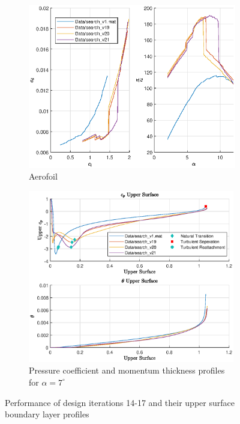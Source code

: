 \documentclass{article}
\begin{document}
\begin{figure}[H]
    \centering
    \begin{subfigure}{0.45\textwidth}
        \centering
        \includegraphics[width=1.2\textwidth, center]{figures/hiRe_lod_21.eps}
        \caption{Aerofoil}
        \label{fig:v21_lod}
    \end{subfigure}
    \begin{subfigure}{0.54\textwidth}
        \centering
        \includegraphics[width=0.99\textwidth]{figures/hiRe_upperprofile_21_a7.eps}
        \caption{Pressure coefficient and momentum thickness profiles for $\alpha = 7^\circ$}
        \label{fig:v21_uprofile}
    \end{subfigure}
    \caption{Performance of design iterations 14-17 and their upper surface boundary layer profiles}
\end{figure}
\end{document}
